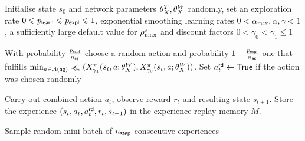 \documentclass[envcountsame]{llncs}
\newcommand\MS[2][r]{\ifx t#1 \textcolor{blue}{[\textbf{MS:} #2]}
  \else \begin{center}\textcolor{blue}{\textbf{MS:} #2} \end{center} \fi}
\begin{document}


\begin{algorithm}[t!]
  \begin{algorithmic}[1]
    \State{}Initialise state \(s_{0}\) and network parameters \(\theta_X^{T}, \theta_X^{W}\) randomly,
    set an exploration rate \(0 \leqslant p_{\mathsf{learn}} \leqslant p_{\mathsf{expl}} \leqslant 1\), exponential
    smoothing learning rates \(0 < \alpha_{\max}, \alpha, \gamma < 1\), a sufficiently large default
    value for \(\rho_{\max}^{\pi}\) and discount factors \(0 < \gamma_{0} < \gamma_{1} \leqslant
    1\)
    \State{}%
    \begin{minipage}[t]{\dimexpr\textwidth-\leftmargin-\labelsep-\labelwidth-\leftmargin+2pt}
      With probability \(\frac{p_{\mathsf{expl}}}{n_{\mathsf{ag}}}\) choose a random action and
      probability \(1-\frac{p_{\mathsf{expl}}}{n_{\mathsf{ag}}}\) one that fulfills
      \(\min_{a \in \mathcal{A}(\mathsf{ag})}\preccurlyeq_{\epsilon}(X^{\pi}_{\gamma_{1}}(s_{t},a; \theta_X^{W}{}),X^\pi_ {\gamma_{0}}(s_{t},a;
      \theta_X^{W}{}))\). Set \(a_{t}^{\mathsf{rd}} \gets \mathsf{True}\) if the action was chosen randomly
    \end{minipage}
    \EndFor
    \State{}%
    \begin{minipage}[t]{\dimexpr\textwidth-\leftmargin-\labelsep-\labelwidth}
    Carry out combined action \(a_{t}\), observe reward \(r_{t}\) and resulting state \(s_{t+1}\).
    Store the experience \((s_{t}, a_{t}, a_{t}^{\mathsf{rd}}, r_{t}, s_{t+1})\) in the experience replay
    memory \(M\).
    \end{minipage}
    \State{}%
    \begin{minipage}[t]{\dimexpr\textwidth-\leftmargin-\labelsep-\labelwidth-\leftmargin+2pt}
      Sample random mini-batch of \(n_{\mathsf{step}}\) consecutive experiences

\end{minipage}
\end{algorithmic}
\end{algorithm}
\end{document}
